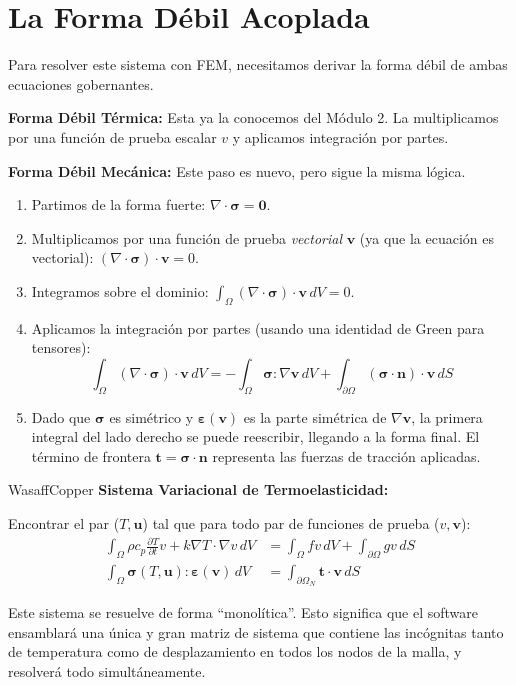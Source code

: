 \section{La Forma Débil Acoplada}
Para resolver este sistema con FEM, necesitamos derivar la forma débil de ambas ecuaciones gobernantes.

\textbf{Forma Débil Térmica:} Esta ya la conocemos del Módulo 2. La multiplicamos por una función de prueba escalar $v$ y aplicamos integración por partes.

\textbf{Forma Débil Mecánica:} Este paso es nuevo, pero sigue la misma lógica.
\begin{enumerate}
    \item Partimos de la forma fuerte: $\nabla \cdot \bm{\sigma} = \mathbf{0}$.
    \item Multiplicamos por una función de prueba \textit{vectorial} $\mathbf{v}$ (ya que la ecuación es vectorial): $(\nabla \cdot \bm{\sigma}) \cdot \mathbf{v} = 0$.
    \item Integramos sobre el dominio: $\int_{\Omega} (\nabla \cdot \bm{\sigma}) \cdot \mathbf{v} \, dV = 0$.
    \item Aplicamos la integración por partes (usando una identidad de Green para tensores):
    $$ \int_{\Omega} (\nabla \cdot \bm{\sigma}) \cdot \mathbf{v} \, dV = - \int_{\Omega} \bm{\sigma} : \nabla\mathbf{v} \, dV + \int_{\partial \Omega} (\bm{\sigma}\cdot\mathbf{n}) \cdot \mathbf{v} \, dS $$
    \item Dado que $\bm{\sigma}$ es simétrico y $\bm{\varepsilon}(\mathbf{v})$ es la parte simétrica de $\nabla\mathbf{v}$, la primera integral del lado derecho se puede reescribir, llegando a la forma final. El término de frontera $\mathbf{t} = \bm{\sigma}\cdot\mathbf{n}$ representa las fuerzas de tracción aplicadas.
\end{enumerate}

\begin{keybox}{WasaffCopper}
    \textbf{Sistema Variacional de Termoelasticidad:}
    
    Encontrar el par ($T, \mathbf{u}$) tal que para todo par de funciones de prueba ($v, \mathbf{v}$):
    \begin{align}
        \int_{\Omega} \rho c_p \frac{\partial T}{\partial t} v + k \nabla T \cdot \nabla v \, dV &= \int_{\Omega} fv \, dV + \int_{\partial \Omega} gv \, dS \\
        \int_{\Omega} \bm{\sigma}(T, \mathbf{u}) : \bm{\varepsilon}(\mathbf{v}) \, dV &= \int_{\partial \Omega_N} \mathbf{t} \cdot \mathbf{v} \, dS
    \end{align}
\end{keybox}

Este sistema se resuelve de forma ``monolítica''. Esto significa que el software ensamblará una única y gran matriz de sistema que contiene las incógnitas tanto de temperatura como de desplazamiento en todos los nodos de la malla, y resolverá todo simultáneamente.